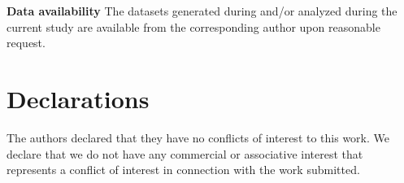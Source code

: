 \documentclass[letterpaper,10pt]{article}
\numberwithin{equation}{section}
\numberwithin{figure}{section}
\numberwithin{table}{section}
\begin{document}
\newpage
\textbf{Data availability} The datasets generated during and/or analyzed during the current study are available from
 the corresponding author upon reasonable request.

\section{Declarations}
The authors declared that they have no conflicts of interest to this work. 
We declare that we do not have any commercial or associative interest that represents a conflict of interest in connection with the work submitted.


\end{document}
